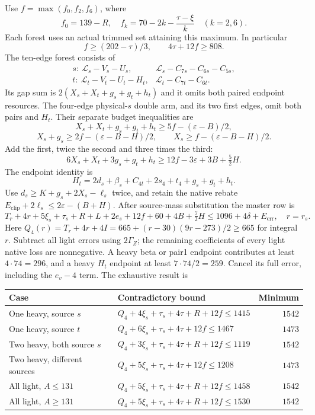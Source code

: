 \documentclass[11pt,letterpaper]{article}
\theoremstyle{definition}\newtheorem{definition}[theorem]{Definition}
\begin{document}
Use $f=\max(f_0,f_2,f_6)$, where
\[
 f_0=139-R,
 \quad f_k=70-2k-\frac{\tau-\xi}{k}\quad(k=2,6).
\]
Each forest uses an actual trimmed set attaining this maximum. In particular
\begin{equation}\label{eq:z3-uniform}
 f\ge(202-\tau)/3,\qquad4\tau+12f\ge808.
\end{equation}
The ten-edge forest consists of
\[
\begin{array}{ll}
s:\ \mathcal L_s-V_s-U_s,&\mathcal L_s-C_{7s}-C_{6s}-C_{5s},\\
t:\ \mathcal L_t-V_t-U_t-H_t,&\mathcal L_t-C_{7t}-C_{6t}.
\end{array}
\]
Its gap sum is $2(X_s+X_t+g_s+g_t+h_t)$ and it omits both paired endpoint resources. The four-edge physical-$s$ double arm, and its two first edges, omit both pairs and $H_t$. Their separate budget inequalities are
\[
 X_s+X_t+g_s+g_t+h_t\ge5f-(\varepsilon-B)/2,
\]
\[
 X_s+g_s\ge2f-(\varepsilon-B-H)/2,
 \qquad X_s\ge f-(\varepsilon-B-H)/2.
\]
Add the first, twice the second and three times the third:
\[
 6X_s+X_t+3g_s+g_t+h_t\ge12f-3\varepsilon+3B+\tfrac52H.
\]
The endpoint identity is
\[
 H_t=2d_s+\beta_s+C_{4t}+2s_4+t_4+g_s+g_t+h_t.
\]
Use $d_s\ge K+g_s+2X_s-\ell_s$ twice, and retain the native rebate
$E_{\mathrm{clip}}+2\ell_s\le2\varepsilon-(B+H)$.
After source-mass substitution the master row is
\begin{equation}\label{eq:z3a1master}
 T_r+4r+5\xi_s+\tau_s+R+L+2e_s+12f+60+4B+\tfrac72H
 \le1096+4\delta+E_{\mathrm{err}},\quad r=r_s.
\end{equation}
Here $Q_4(r)=T_r+4r+4I=665+(r-30)(9r-273)/2\ge665$ for integral $r$.
Subtract all light errors using $2\Gamma_Z$; the remaining coefficients of every light native loss are nonnegative. A heavy beta or pair1 endpoint contributes at least $4\cdot74=296$, and a heavy $H_t$ endpoint at least $7\cdot74/2=259$. Cancel its full error, including the $e_v-4$ term. The exhaustive result is
\begin{center}\small
\begin{tabular}{p{.35\linewidth}p{.38\linewidth}r}
Case&Contradictory bound&Minimum\\\hline
One heavy, source $s$&$Q_4+4\xi_s+\tau_s+4\tau+R+12f\le1415$&$1542$\\
One heavy, source $t$&$Q_4+6\xi_s+\tau_s+4\tau+12f\le1467$&$1473$\\
Two heavy, both source $s$&$Q_4+3\xi_s+\tau_s+4\tau+R+12f\le1119$&$1542$\\
Two heavy, different sources&$Q_4+5\xi_s+\tau_s+4\tau+12f\le1208$&$1473$\\
All light, $A\le131$&$Q_4+5\xi_s+\tau_s+4\tau+R+12f\le1458$&$1542$\\
All light, $A\ge131$&$Q_4+5\xi_s+\tau_s+4\tau+R+12f\le1530$&$1542$
\end{tabular}
\end{center}
\end{document}
